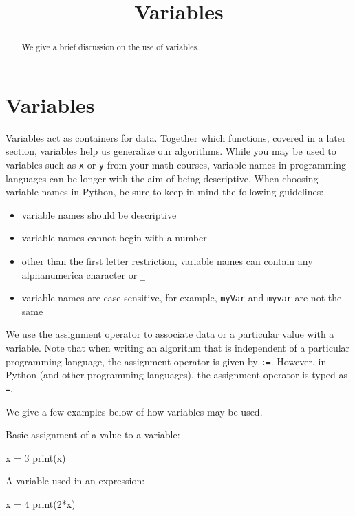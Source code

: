 \documentclass{ximera}
\title{Variables}
\begin{document}
  
\begin{abstract}  
We give a brief discussion on the use of variables.
\end{abstract}  
\maketitle

\section{Variables}

Variables act as containers for data. Together which functions, covered in a later section, variables help us generalize our algorithms. While you may be used to variables such as \verb|x| or \verb|y| from your math courses, variable names in programming languages can be longer with the aim of being descriptive. When choosing variable names in Python, be sure to keep in mind the following guidelines:

\begin{itemize}
	\item variable names should be descriptive
	\item variable names cannot begin with a number
	\item other than the first letter restriction, variable names can contain any alphanumerica character or \verb|_|
	\item variable names are case sensitive, for example, \verb|myVar| and \verb|myvar| are not the same
\end{itemize}

We use the assignment operator to associate data or a particular value with a variable. Note that when writing an algorithm that is independent of a particular programming language, the assignment operator is given by \verb|:=|. However, in Python (and other programming languages), the assignment operator is typed as \verb|=|.

We give a few examples below of how variables may be used.

Basic assignment of a value to a variable:

\begin{sageCell}
	x = 3
	print(x)
\end{sageCell}

A variable used in an expression:

\begin{sageCell}
	x = 4
	print(2*x)
\end{sageCell}
\end{document}
